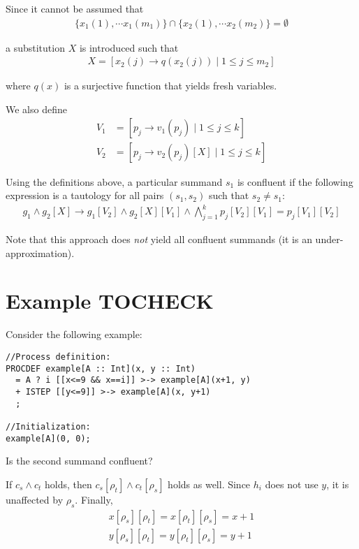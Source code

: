 Since it cannot be assumed that
\begin{align*}
\{ x_1(1), \cdots{} x_1(m_1) \} \cap \{ x_2(1), \cdots{} x_2(m_2) \} = \emptyset{}
\end{align*}

a substitution $X$ is introduced such that
\begin{align*}
X = [ x_2(j) \rightarrow q(x_2(j)) \;|\; 1 \leq j \leq m_2 ]
\end{align*}

where $q(x)$ is a surjective function that yields fresh variables.

We also define
\begin{align*}
V_{1} &= [p_j \rightarrow v_1(p_j) \;|\; 1 \leq j \leq k] \\
V_{2} &= [p_j \rightarrow v_2(p_j)[X] \;|\; 1 \leq j \leq k]
\end{align*}

Using the definitions above, a particular \istep{} summand $s_1$ is confluent if the following expression is a tautology for all pairs $(s_1, s_2)$ such that $s_2 \neq s_1$:
\begin{align*}
g_1 \land g_2[X] \rightarrow g_1[V_2] \land g_2[X][V_1] \land \bigwedge\limits_{j=1}^{k} p_j[V_2][V_1] = p_j[V_1][V_2]
\end{align*}

Note that this approach does \emph{not} yield all confluent \istep{} summands (it is an under-approximation).

\section{Example TOCHECK}

Consider the following example:

\begin{lstlisting}
//Process definition:
PROCDEF example[A :: Int](x, y :: Int)
  = A ? i [[x<=9 && x==i]] >-> example[A](x+1, y)
  + ISTEP [[y<=9]] >-> example[A](x, y+1)
  ;

//Initialization:
example[A](0, 0);
\end{lstlisting}

Is the second summand confluent?

If $c_s \land c_t$ holds, then $c_s[\rho_t] \land c_t[\rho_s]$ holds as well.
Since $h_i$ does not use $y$, it is unaffected by $\rho_s$.
Finally,
\begin{align*}
x[\rho_s][\rho_t] = x[\rho_t][\rho_s] = x+1 \\
y[\rho_s][\rho_t] = y[\rho_t][\rho_s] = y+1
\end{align*}


